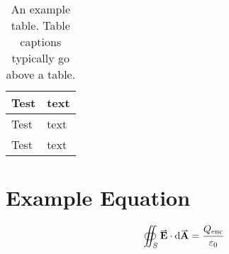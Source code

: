 \documentclass[a4paper, 12pt, english]{article}
\begin{document}
            \begin{table}[!h]
                \centering
                \caption{An example table. Table captions typically go above a table.}
                \label{table: example}
                \begin{tabular}{ |C{0.2\textwidth}|m{0.2\textwidth}| }
                    \hline
                    Test & text\\
                    \hline
                    \hline
                    Test & text\\
                    \hline
                    Test & text\\
                    \hline
                \end{tabular}
            \end{table}

        \section{Example Equation}
            \label{app: example equation}

            \begin{equation}
                \oiint_S \vect{E} \cdot \dd{\vect{A}} = \frac{Q_{\text{enc}}}{\varepsilon_0}
                \label{eq: Gauss Law}
            \end{equation}
\end{document}
